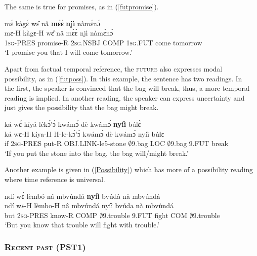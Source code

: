 \noindent The same is true for promises, as in (\ref{futpromise}).

\begin{exe} 
\ex\label{futpromise}
  \glll  mɛ́ kàgɛ́ wɛ̂ nâ {\bfseries mɛ̀ɛ̀} {\bfseries njì} nàmɛ́nɔ́ \\
         mɛ-H kàgɛ-H wɛ̂ nâ mɛ̀ɛ̀ njì nàmɛ́nɔ́ \\
           1\textsc{sg}-PRES promise-R 2\textsc{sg}.NSBJ COMP 1\textsc{sg}.FUT come tomorrow \\
    \trans `I promise you that I will come tomorrow.'
\end{exe}


\noindent Apart from factual temporal reference, the \textsc{future} also expresses modal possibility, as in (\ref{futposs}). In this example, the sentence has two readings. In the first, the speaker is convinced that the bag will break, thus, a more temporal reading is implied. In another reading, the speaker can express uncertainty and just gives the possibility that the bag might  break.

\begin{exe} 
\ex\label{futposs}
  \glll  ká wɛ́ kíyá lékɔ́'ɔ̀ kwámɔ́ dè kwámɔ́ {\bfseries nyíì} búlɛ̀ \\
         ká wɛ-H kíya-H H-le-kɔ́'ɔ̀ kwámɔ́ dè kwámɔ́ nyíì búlɛ \\
           if 2\textsc{sg}-PRES put-R OBJ.LINK-le5-stone $\emptyset$9.bag LOC $\emptyset$9.bag 9.FUT break \\
    \trans `If you put the stone into the bag, the bag will/might break.'
\end{exe}

\noindent Another example is given in (\ref{Possibility}) which has more of a possibility reading where time reference is universal.

\begin{exe} 
\ex\label{Possibility} 
  \glll ndí wɛ́ lèmbó nâ mbvúndá {\bfseries nyíì} bvúdà nà mbvúndá \\
        ndí wɛ-H lèmbo-H nâ mbvúndá nyíì bvúda nà mbvúndá \\
         but 2\textsc{sg}-PRES know-R COMP $\emptyset$9.trouble 9.FUT fight COM $\emptyset$9.trouble\\
    \trans `But you know that trouble will fight with trouble.'
\end{exe} 





\subsubsection{\textsc{Recent past (PST1)}}
\label{sec:pst1}

